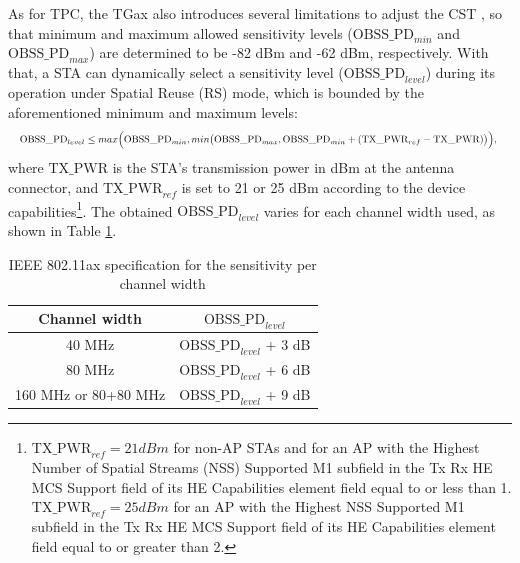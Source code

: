 \documentclass[12pt, a4paper,twoside]{tesi_upf}
\begin{document}
			As for TPC, the TGax also introduces several limitations to adjust the CST \cite{tgax2016draft}, so that minimum and maximum allowed sensitivity levels ($\text{OBSS\_PD}_{min}$ and $\text{OBSS\_PD}_{max}$) are determined to be -82 dBm and -62 dBm, respectively. With that, a STA can dynamically select a sensitivity level ($\text{OBSS\_PD}_{level}$) during its operation under Spatial Reuse (RS) mode, which is bounded by the aforementioned minimum and maximum levels:			
			\begin{equation}
				\resizebox{1\hsize}{!}{$\text{OBSS\_PD}_{level} \leq max\Big(\text{OBSS\_PD}_{min}, min\big(\text{OBSS\_PD}_{max}, \text{OBSS\_PD}_{min} + (\text{TX\_PWR}_{ref}-\text{TX\_PWR})\big)\Big),$
				\nonumber}				
			\end{equation}
			where $\text{TX\_PWR}$ is the STA's transmission power in dBm at the antenna connector, and $\text{TX\_PWR}_{ref}$ is set to 21 or 25 dBm according to the device capabilities\footnote{$\text{TX\_PWR}_{ref} = 21 dBm$ for non-AP STAs and for an AP with the Highest Number of Spatial Streams (NSS) Supported M1 subfield in the Tx Rx HE MCS Support field of its HE Capabilities element field equal to or less than 1. $\text{TX\_PWR}_{ref} = 25 dBm$ for an AP with the Highest NSS Supported M1 subfield in the Tx Rx HE MCS Support field of its HE Capabilities element field equal to or greater than 2.}. The obtained $\text{OBSS\_PD}_{level}$ varies for each channel width used, as shown in Table \ref{tbl:sensitivity_channel_width}.
			\begin{table}[t!]
				\centering
				\begin{tabular}{|c|l|}
					\hline
					\textbf{Channel width} & \multicolumn{1}{c|}{\textbf{$\text{OBSS\_PD}_{level}$}} \\ \hline
					40 MHz                 & $\text{OBSS\_PD}_{level}$ + 3 dB                        \\ \hline
					80 MHz                 & $\text{OBSS\_PD}_{level}$ + 6 dB                        \\ \hline
					160 MHz or 80+80 MHz   & $\text{OBSS\_PD}_{level}$ + 9 dB                        \\ \hline
				\end{tabular}
				\caption{IEEE 802.11ax specification for the sensitivity per channel width}
				\label{tbl:sensitivity_channel_width}
			\end{table}		
		
\end{document}
